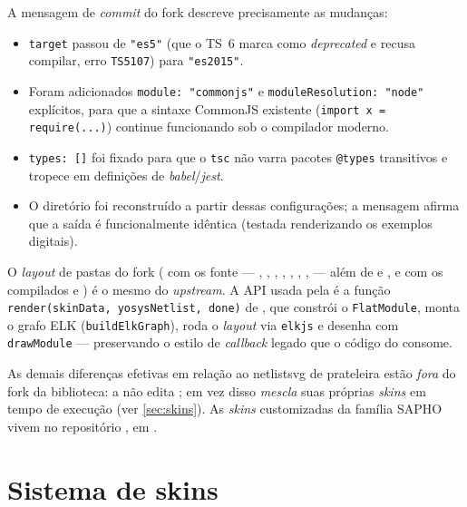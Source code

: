 A mensagem de \emph{commit} do fork descreve precisamente as mudanças:

\begin{itemize}[leftmargin=1.4em]
  \item \lstinline|target| passou de \lstinline|"es5"| (que o TS~6 marca como
        \emph{deprecated} e recusa compilar, erro \lstinline|TS5107|) para
        \lstinline|"es2015"|.
  \item Foram adicionados \lstinline|module: "commonjs"| e
        \lstinline|moduleResolution: "node"| explícitos, para que a sintaxe
        CommonJS existente (\lstinline|import x = require(...)|) continue
        funcionando sob o compilador moderno.
  \item \lstinline|types: []| foi fixado para que o \lstinline|tsc| não varra
        pacotes \lstinline|@types| transitivos e tropece em definições de
        \emph{babel}/\emph{jest}.
  \item O diretório  foi reconstruído a partir dessas
        configurações; a mensagem afirma que a saída é funcionalmente idêntica
        (testada renderizando os exemplos digitais).
\end{itemize}

O \emph{layout} de pastas do fork ( com os  fonte ---
, , , ,
, , , 
--- além de  e , e  com os
 compilados e ) é o mesmo do \emph{upstream}.
A API usada pela  é a função
\lstinline|render(skinData, yosysNetlist, done)| de , que
constrói o \lstinline|FlatModule|, monta o grafo ELK
(\lstinline|buildElkGraph|), roda o \emph{layout} via \lstinline|elkjs| e desenha
com \lstinline|drawModule| --- preservando o estilo de \emph{callback} legado que
o código do  consome.

\begin{nota}
As demais diferenças efetivas em relação ao netlistsvg de prateleira estão
\emph{fora} do fork da biblioteca: a  não edita
; em vez disso \emph{mescla} suas próprias \emph{skins} em
tempo de execução (ver \autoref{sec:skins}). As \emph{skins} customizadas da
família SAPHO vivem no repositório , em .
\end{nota}

\section{Sistema de skins}
\label{sec:skins}

